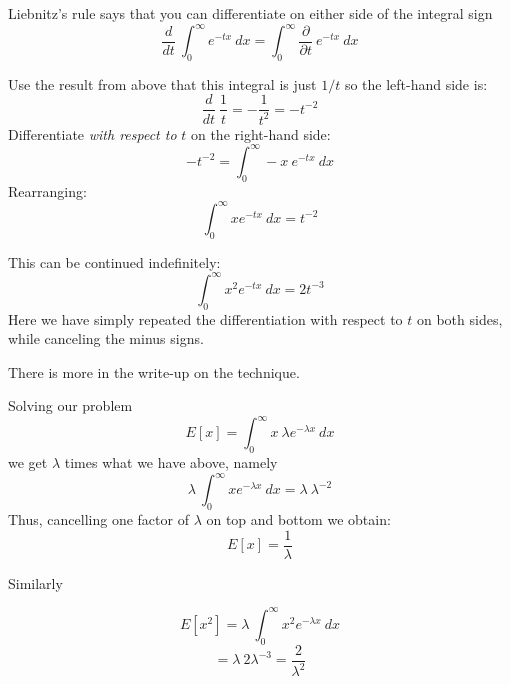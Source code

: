 \documentclass[11pt, oneside]{article}   	%
\begin{document}
Liebnitz's rule says that you can differentiate on either side of the integral sign
\[ \frac{d}{dt} \ \int_0^{\infty} e^{-tx} \ dx = \int_0^{\infty} \frac{\partial}{\partial t} \  e^{-tx} \ dx \]

Use the result from above that this integral is just $1/t$ so the left-hand side is:
\[ \frac{d}{dt} \ \frac{1}{t} = - \frac{1}{t^2} = - t^{-2} \]
Differentiate \emph{with respect to} $t$ on the right-hand side:
\[ - t^{-2} = \int_0^{\infty} -x \  e^{-tx} \ dx \]
Rearranging:
\[ \int_0^{\infty} x e^{-tx} \ dx = t^{-2} \]

This can be continued indefinitely:
\[ \int_0^{\infty} x^2 e^{-tx} \ dx = 2 t^{-3} \]
Here we have simply repeated the differentiation with respect to $t$ on both sides, while canceling the minus signs.

There is more in the write-up on the technique.

Solving our problem
\[ E[x] = \int_0^{\infty} x \  \lambda e^{-\lambda x} \ dx \]
we get $\lambda$ times what we have above, namely
\[ \lambda \ \int_0^{\infty} x e^{-\lambda x} \ dx = \lambda \ \lambda^{-2} \]
Thus, cancelling one factor of $\lambda$ on top and bottom we obtain:
\[ E[x] = \frac{1}{\lambda} \]

Similarly

\[ E[x^2] = \lambda \ \int_0^{\infty} x^2 e^{-\lambda x} \ dx \]
\[ = \lambda \ 2 \lambda ^{-3} = \frac{2}{\lambda^2} \]
\end{document}
